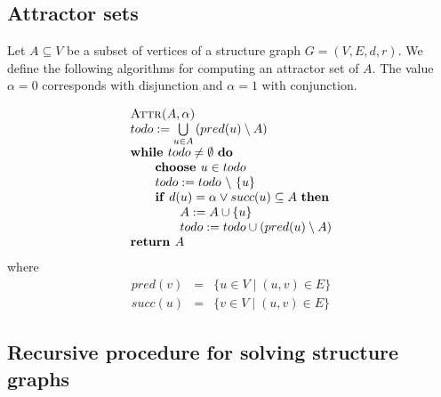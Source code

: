 \documentclass{article}
\begin{document}
\subsection{Attractor sets}
Let $A \subseteq V$ be a subset of vertices of a structure graph $G=(V,E,d,r)$. We
define the following algorithms for computing an attractor set of $A$. The value
$\alpha = 0$ corresponds with disjunction and $\alpha = 1$ with conjunction.

\begin{equation*}
\begin{array}{l}
\text{\textsc{Attr(}}A,\alpha \text{\textsc{)}} \\ 
todo:=\bigcup\limits_{u\in A}\left( pred(u)\setminus A\right)  \\ 
\text{\textbf{while }}todo\neq \emptyset \text{ \textbf{do}} \\ 
\qquad \text{\textbf{choose }}u\in todo \\ 
\qquad todo:=todo\ \backslash \ \{u\} \\ 
\qquad \text{\textbf{if} }d(u) = \alpha \vee succ(u)\subseteq A\text{ \textbf{then}} \\ 
\qquad \qquad A:=A\cup \{u\} \\ 
\qquad \qquad todo:=todo\cup \left( pred(u)\setminus A\right)  \\ 
\text{\textbf{return }}A%
\end{array}%
\end{equation*}%
where%
\begin{eqnarray*}
pred(v) &=&\{u\in V\mid (u,v)\in E\} \\
succ(u) &=&\{v\in V\mid (u,v)\in E\}
\end{eqnarray*}%

\subsection{Recursive procedure for solving structure graphs}
\end{document}
